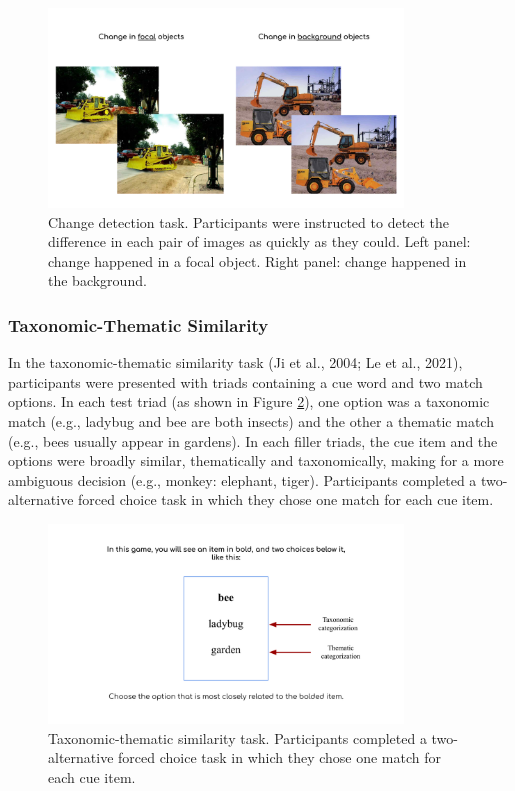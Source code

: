 \documentclass[
  man,floatsintext]{apa6}
\begin{document}
\begin{figure}[!h]

{\centering \includegraphics[width=1\linewidth,height=200px]{CCRR_manuscript_files/appendix_task_examples/e2_cd} 

}

\caption{Change detection task. Participants were instructed to detect the difference in each pair of images as quickly as they could. Left panel: change happened in a focal object. Right panel: change happened in the background.}\label{fig:change-detection}
\end{figure}

\hypertarget{taxonomic-thematic-similarity-2}{%
\subsubsection{Taxonomic-Thematic Similarity}\label{taxonomic-thematic-similarity-2}}

In the taxonomic-thematic similarity task (Ji et al., 2004; Le et al., 2021), participants were presented with triads containing a cue word and two match options. In each test triad (as shown in Figure \ref{fig:similarity}), one option was a taxonomic match (e.g., ladybug and bee are both insects) and the other a thematic match (e.g., bees usually appear in gardens). In each filler triads, the cue item and the options were broadly similar, thematically and taxonomically, making for a more ambiguous decision (e.g., monkey: elephant, tiger). Participants completed a two-alternative forced choice task in which they chose one match for each cue item.

\begin{figure}[!h]

{\centering \includegraphics[width=1\linewidth,height=200px]{CCRR_manuscript_files/appendix_task_examples/e2_similarity} 

}

\caption{Taxonomic-thematic similarity task. Participants completed a two-alternative forced choice task in which they chose one match for each cue item.}\label{fig:similarity}
\end{figure}
\end{document}
